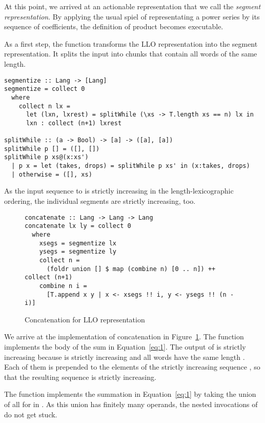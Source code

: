At this point, we arrived at an actionable representation that we call
the \emph{segment representation}. By applying
the usual spiel of representating a power series by its sequence of
coefficients, the definition of product becomes executable.

As a first step, the function  transforms the LLO
representation into the segment representation. It splits the input
into chunks that contain all words of the same length.
\begin{lstlisting}
segmentize :: Lang -> [Lang]
segmentize = collect 0
  where
    collect n lx =
      let (lxn, lxrest) = splitWhile (\xs -> T.length xs == n) lx in 
      lxn : collect (n+1) lxrest

splitWhile :: (a -> Bool) -> [a] -> ([a], [a])
splitWhile p [] = ([], [])
splitWhile p xs@(x:xs')
  | p x = let (takes, drops) = splitWhile p xs' in (x:takes, drops)
  | otherwise = ([], xs)
\end{lstlisting}
As the input sequence to  is strictly increasing in the
length-lexicographic ordering, the individual segments are strictly
increasing, too.

\begin{figure}[tp]
\begin{lstlisting}
concatenate :: Lang -> Lang -> Lang
concatenate lx ly = collect 0
  where
    xsegs = segmentize lx
    ysegs = segmentize ly
    collect n =
      (foldr union [] $ map (combine n) [0 .. n]) ++ collect (n+1)
    combine n i =
      [T.append x y | x <- xsegs !! i, y <- ysegs !! (n - i)]
\end{lstlisting}
  \caption{Concatenation for LLO representation}
  \label{fig:concatenate-with-segments}
\end{figure}
We arrive at the implementation of concatenation in Figure~\ref{fig:concatenate-with-segments}.
The function  implements the body of the sum
in Equation~\eqref{eq:1}. The output of  is strictly increasing
because  is strictly increasing and all words have the same length .
Each of them is prepended to the elements of the strictly increasing
sequence , so that the resulting sequence is
strictly increasing.

The function  implements the summation in Equation~\eqref{eq:1}
by taking the union of all  for  in \code{[0
.. n]}. As this union has finitely many operands, the nested
invocations of  do not get stuck.

